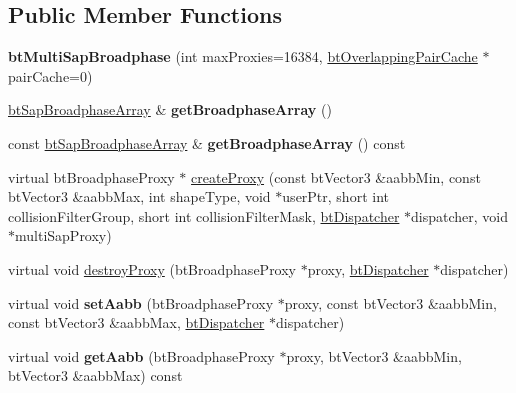 \subsection*{Public Member Functions}
\begin{DoxyCompactItemize}
\item 
\hypertarget{classbt_multi_sap_broadphase_ac950811ea4dc8e9798165f08cd2a1519}{{\bfseries bt\+Multi\+Sap\+Broadphase} (int max\+Proxies=16384, \hyperlink{classbt_overlapping_pair_cache}{bt\+Overlapping\+Pair\+Cache} $\ast$pair\+Cache=0)}\label{classbt_multi_sap_broadphase_ac950811ea4dc8e9798165f08cd2a1519}

\item 
\hypertarget{classbt_multi_sap_broadphase_a6b867c146b6ad6c9e986a1ff09ec52b2}{\hyperlink{classbt_aligned_object_array}{bt\+Sap\+Broadphase\+Array} \& {\bfseries get\+Broadphase\+Array} ()}\label{classbt_multi_sap_broadphase_a6b867c146b6ad6c9e986a1ff09ec52b2}

\item 
\hypertarget{classbt_multi_sap_broadphase_a5aa9d8f58852eedf1d11d032571e222c}{const \hyperlink{classbt_aligned_object_array}{bt\+Sap\+Broadphase\+Array} \& {\bfseries get\+Broadphase\+Array} () const }\label{classbt_multi_sap_broadphase_a5aa9d8f58852eedf1d11d032571e222c}

\item 
virtual bt\+Broadphase\+Proxy $\ast$ \hyperlink{classbt_multi_sap_broadphase_a56e2b68f3b1c54dbc102d5f3b8004d55}{create\+Proxy} (const bt\+Vector3 \&aabb\+Min, const bt\+Vector3 \&aabb\+Max, int shape\+Type, void $\ast$user\+Ptr, short int collision\+Filter\+Group, short int collision\+Filter\+Mask, \hyperlink{classbt_dispatcher}{bt\+Dispatcher} $\ast$dispatcher, void $\ast$multi\+Sap\+Proxy)
\item 
virtual void \hyperlink{classbt_multi_sap_broadphase_a8cbeafd597e31f634863efe5186000b9}{destroy\+Proxy} (bt\+Broadphase\+Proxy $\ast$proxy, \hyperlink{classbt_dispatcher}{bt\+Dispatcher} $\ast$dispatcher)
\item 
\hypertarget{classbt_multi_sap_broadphase_aaef14203e346faabcde9f3ac870f5d66}{virtual void {\bfseries set\+Aabb} (bt\+Broadphase\+Proxy $\ast$proxy, const bt\+Vector3 \&aabb\+Min, const bt\+Vector3 \&aabb\+Max, \hyperlink{classbt_dispatcher}{bt\+Dispatcher} $\ast$dispatcher)}\label{classbt_multi_sap_broadphase_aaef14203e346faabcde9f3ac870f5d66}

\item 
\hypertarget{classbt_multi_sap_broadphase_afc2ef0315af26c4c9436a8d2906ff400}{virtual void {\bfseries get\+Aabb} (bt\+Broadphase\+Proxy $\ast$proxy, bt\+Vector3 \&aabb\+Min, bt\+Vector3 \&aabb\+Max) const }\label{classbt_multi_sap_broadphase_afc2ef0315af26c4c9436a8d2906ff400}


\end{DoxyCompactItemize}
